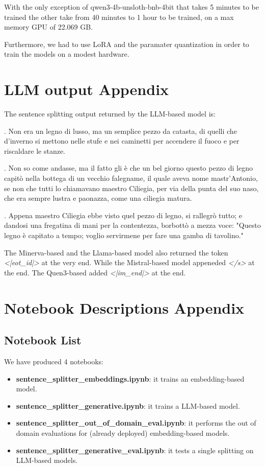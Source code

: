 \documentclass[11pt]{article}
\begin{document}
With the only exception of qwen3-4b-unsloth-bnb-4bit that takes 5 minutes
to be trained the other take from 40 minutes to 1 hour to be trained,
on a max memory GPU of 22.069 GB.

Furthermore,
we had to use LoRA and the paramater quantization in order to train the models
on a modest hardware.

\appendix

\section{LLM output Appendix}
\label{sec:appendix1}

The sentence splitting output returned by the LLM-based model is:

{\selectfont

. Non era un legno di lusso, ma un semplice pezzo da catasta, di quelli che d’inverno si mettono nelle stufe e nei caminetti per accendere il fuoco e per riscaldare le stanze.

. Non so come andasse, ma il fatto gli è che un bel giorno questo pezzo di legno capitò nella bottega di un vecchio falegname, il quale aveva nome mastr’Antonio, se non che tutti lo chiamavano maestro Ciliegia, per via della punta del suo naso, che era sempre lustra e paonazza, come una ciliegia matura.

. Appena maestro Ciliegia ebbe visto quel pezzo di legno, si rallegrò tutto; e dandosi una fregatina di mani per la contentezza, borbottò a mezza voce: "Questo legno è capitato a tempo; voglio servirmene per fare una gamba di tavolino."

}

The Minerva-based and the Llama-based model also returned the token \emph{<|eot\_id|>}
at the very end. While the Mistral-based model appeneded \emph{</s>} at the end.
The Quen3-based added \emph{<|im\_end|>} at the end.

\section{Notebook Descriptions Appendix}
\label{sec:appendix2}

\subsection{Notebook  List}

We have produced 4 notebooks:

 \begin{itemize}
	\item \textbf{sentence\_splitter\_embeddings.ipynb}: it trains an embedding-based
	model.
	\item \textbf{sentence\_splitter\_generative.ipynb}: it trains a LLM-based model.
	\item \textbf{sentence\_splitter\_out\_of\_domain\_eval.ipynb}: it performs the out of domain 
	evaluations for (already deployed) embedding-based models.
	\item \textbf{sentence\_splitter\_generative\_eval.ipynb}: it tests a single splitting on
	LLM-based models.
\end{itemize}
\end{document}
